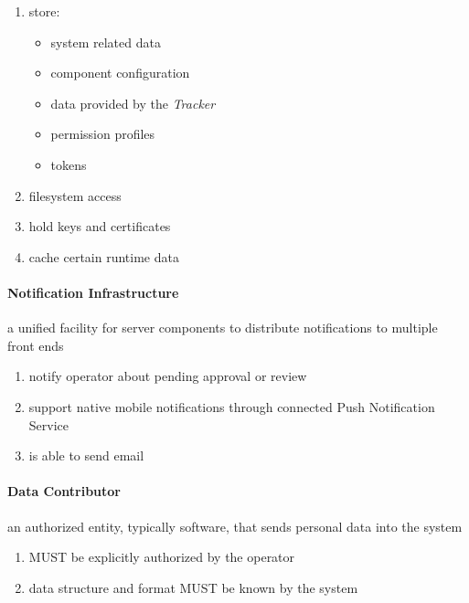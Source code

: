\documentclass[12pt,english,a4paper,titlepage,cleardoublepage=empty,dottedtoc]{report}
\providecommand{\tightlist}{%
  \setlength{\itemsep}{0pt}\setlength{\parskip}{0pt}}
\begin{document}
\begin{enumerate}
\def\labelenumi{\alph{enumi})}
\tightlist
\item
  store:

  \begin{itemize}
  \tightlist
  \item
    system related data
  \item
    component configuration
  \item
    data provided by the \emph{Tracker}
  \item
    permission profiles
  \item
    tokens
  \end{itemize}
\item
  filesystem access
\item
  hold keys and certificates
\item
  cache certain runtime data
\end{enumerate}

\paragraph{Notification
Infrastructure}\label{notification-infrastructure-1}

a unified facility for server components to distribute notifications to
multiple front ends

\begin{enumerate}
\def\labelenumi{\alph{enumi})}
\tightlist
\item
  notify operator about pending approval or review
\item
  support native mobile notifications through connected Push
  Notification Service
\item
  is able to send email
\end{enumerate}

\paragraph{Data Contributor}\label{data-contributor}

an authorized entity, typically software, that sends personal data into
the system

\begin{enumerate}
\def\labelenumi{\alph{enumi})}
\tightlist
\item
  MUST be explicitly authorized by the operator
\item
  data structure and format MUST be known by the system
\end{enumerate}
\end{document}
